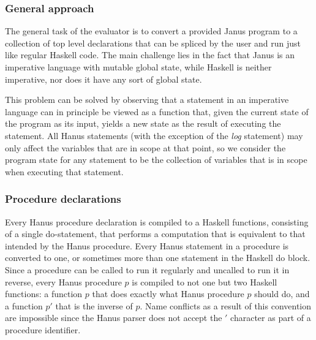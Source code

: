 \documentclass[12pt,a4paper]{article}
\begin{document}
\subsubsection{General approach}
The general task of the evaluator is to convert a provided Janus program to a collection of top level declarations that can be spliced by the user and run just like regular Haskell code. The main challenge lies in the fact that Janus is an imperative language with mutable global state, while Haskell is neither imperative, nor does it have any sort of global state. 

This problem can be solved by observing that a statement in an imperative language can in principle be viewed as a function that, given the current state of the program as its input, yields a new state as the result of executing the statement. All Hanus statements (with the exception of the \emph{log} statement) may only affect the variables that are in scope at that point, so we consider the program state for any statement to be the collection of variables that is in scope when executing that statement. 

\subsubsection{Procedure declarations}
Every Hanus procedure declaration is compiled to a Haskell functions, consisting of a single do-statement, that performs a computation that is equivalent to that intended by the Hanus procedure. Every Hanus statement in a procedure is converted to one, or sometimes more than one statement in the Haskell do block. Since a procedure can be called to run it regularly and uncalled to run it in reverse, every Hanus procedure $p$ is compiled to not one but two Haskell functions: a function $p$ that does exactly what Hanus procedure $p$ should do, and a function $p'$ that is the inverse of $p$. Name conflicts as a result of this convention are impossible since the Hanus parser does not accept the $'$ character as part of a procedure identifier.
\end{document}
